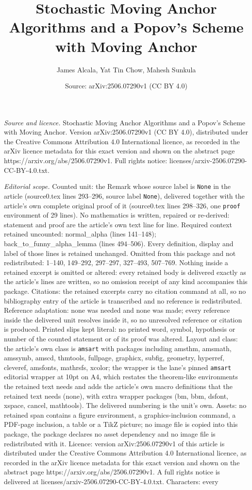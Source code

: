 \documentclass[10pt,a4paper]{amsart}
\title[Stochastic Moving Anchor Algorithms and a Popov's Scheme wit]{Stochastic Moving Anchor Algorithms and a Popov's Scheme with Moving Anchor}
\author{James Alcala, Yat Tin Chow, Mahesh Sunkula}
\date{Source: arXiv:2506.07290v1 (CC BY 4.0)}
\begin{document}
\maketitle

\noindent\emph{Source and licence.} Stochastic Moving Anchor Algorithms and a Popov's Scheme with Moving Anchor. Version arXiv:2506.07290v1 (CC BY 4.0), distributed under the Creative Commons Attribution 4.0 International licence, as recorded in the arXiv licence metadata for this exact version and shown on the abstract page https://arxiv.org/abs/2506.07290v1. Full rights notice: licenses/arxiv-2506.07290-CC-BY-4.0.txt.\par\smallskip

\noindent\textit{Editorial scope.} Counted unit: the Remark whose source label is \texttt{None} in the article (source0.tex lines 293--296, source label \texttt{None}), delivered together with the article's own complete original proof of it (source0.tex lines 298--326, one \texttt{proof} environment of 29 lines). No mathematics is written, repaired or re-derived: statement and proof are the article's own text line for line. Required context retained uncounted: normal\_alpha (lines 141--148); back\_to\_funny\_alpha\_lemma (lines 494--506). Every definition, display and label of those lines is retained unchanged. Omitted from this package and not redistributed: 1--140, 149--292, 297--297, 327--493, 507--769. Nothing inside a retained excerpt is omitted or altered: every retained body is delivered exactly as the article's lines are written, so no omission receipt of any kind accompanies this package. Citations: the retained excerpts carry no citation command at all, so no bibliography entry of the article is transcribed and no reference is redistributed. Reference adaptation: none was needed and none was made; every reference inside the delivered unit resolves inside it, so no unresolved reference or citation is produced. Printed slips kept literal: no printed word, symbol, hypothesis or number of the counted statement or of its proof was altered. Layout and class: the article's own class is \texttt{amsart} with packages including amsthm, amsmath, amssymb, amscd, thmtools, fullpage, graphicx, subfig, geometry, hyperref, cleveref, amsfonts, mathrsfs, xcolor; the wrapper is the lane's pinned \texttt{amsart} editorial wrapper at 10pt on A4, which restates the theorem-like environments the retained text needs and adds the article's own macro definitions that the retained text needs (none), with extra wrapper packages (bm, bbm, dsfont, xspace, cancel, mathtools). The delivered numbering is the unit's own. Assets: no retained span contains a figure environment, a graphics-inclusion command, a PDF-page inclusion, a table or a TikZ picture; no image file is copied into this package, the package declares no asset dependency and no image file is redistributed with it. Licence: version arXiv:2506.07290v1 of this article is distributed under the Creative Commons Attribution 4.0 International licence, as recorded in the arXiv licence metadata for this exact version and shown on the abstract page https://arxiv.org/abs/2506.07290v1. A full rights notice is delivered at licenses/arxiv-2506.07290-CC-BY-4.0.txt. Characters: every 
\end{document}
